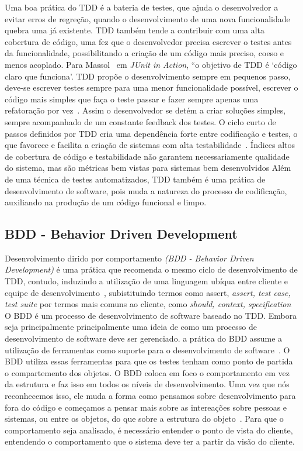 Uma boa prática do TDD é a bateria de testes, que ajuda o desenvolvedor a evitar 
erros de regreção, quando o desenvolvimento de uma nova funcionalidade quebra uma 
já existente. TDD também tende a contribuir com uma alta cobertura de código, uma 
fez que o desenvolvedor precisa escrever o testes antes da funcionalidade, 
possibilitando a criação de um código mais preciso, coeso e menos acoplado. 
%
Para Massol~ em \textit{JUnit in Action}, “o objetivo de TDD é ‘código claro que 
funciona’.
%
TDD propõe o desenvolvimento sempre em pequenos passo, deve-se escrever testes sempre 
para uma menor funcionalidade possível, escrever o código mais simples que faça o 
teste passar e fazer sempre apenas uma refatoração por vez~. Assim o 
desenvolvedor se detém a criar soluções simples, sempre acompanhado de um constante 
feedback dos testes.
%
O ciclo curto de passos definidos por TDD cria uma dependência forte entre codificação 
e testes, o que favorece e facilita a criação de sistemas com alta testabilidade~. 
Índices altos de cobertura de código e testabilidade não garantem necessariamente 
qualidade do sistema, mas são métricas bem vistas para sistemas bem desenvolvidos
%
Além de uma técnica de testes automatizados, TDD também é uma prática de desenvolvimento 
de software, pois muda a natureza do processo de codificação, auxiliando na produção 
de um código funcional e limpo.
%

\subsection{BDD - Behavior Driven Development}
Desenvolvimento dirido por comportamento \textit{(BDD - Behavior Driven Development)} 
é uma prática que recomenda o mesmo ciclo de desenvolvimento de TDD, contudo, induzindo 
a utilização de uma linguagem ubíqua entre cliente e equipe de desenvolvimento~, subistituindo termos como assert, \textit{assert, test case, test suite} por termos 
mais comuns ao cliente, como \textit{should, context, specification}
%
O BDD é um processo de desenvolvimento de software baseado no TDD. Embora seja 
principalmente principalmente uma ideia de como um processo de desenvolvimento de 
software deve ser gerenciado. a prática do BDD assume a utilização de ferramentas 
como suporte para o desenvolvimento de software~. O BDD utiliza 
essas ferramentas para que os testes tenham como ponto de partida o compartemento 
dos objetos.
%
O BDD coloca em foco o comportamento em vez da estrutura e faz isso em todos os 
níveis de desenvolvimento. Uma vez que nós reconhecemos isso, ele muda a forma 
como pensamos sobre desenvolvimento para fora do código e começamos a pensar mais 
sobre as intereações sobre pessoas e sistemas, ou entre os objetos, do que sobre a 
estrutura do objeto~\cite{chelimsky2010}.
%
Para que o comportamento seja analisado, é necessário entender o ponto de vista do 
cliente, entendendo o comportamento que o sistema deve ter a partir da visão do cliente. 
%
